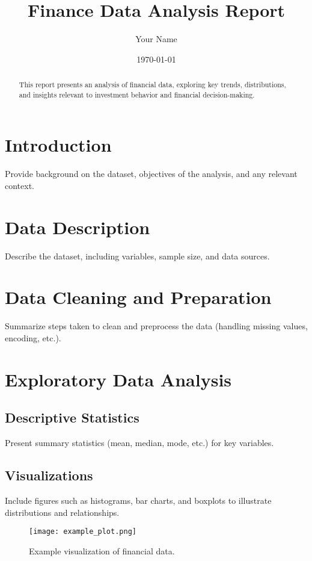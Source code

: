 \documentclass[12pt]{article}
\title{Finance Data Analysis Report}
\author{Your Name}
\date{\today}
\begin{document}
\maketitle

\begin{abstract}
This report presents an analysis of financial data, exploring key trends, distributions, and insights relevant to investment behavior and financial decision-making.
\end{abstract}

\section{Introduction}
Provide background on the dataset, objectives of the analysis, and any relevant context.

\section{Data Description}
Describe the dataset, including variables, sample size, and data sources.

\section{Data Cleaning and Preparation}
Summarize steps taken to clean and preprocess the data (handling missing values, encoding, etc.).

\section{Exploratory Data Analysis}
\subsection{Descriptive Statistics}
Present summary statistics (mean, median, mode, etc.) for key variables.

\subsection{Visualizations}
Include figures such as histograms, bar charts, and boxplots to illustrate distributions and relationships.

\begin{figure}[h!]
    \centering
    \texttt{[image: example\_plot.png]}
    \caption{Example visualization of financial data.}
\end{figure}
\end{document}
